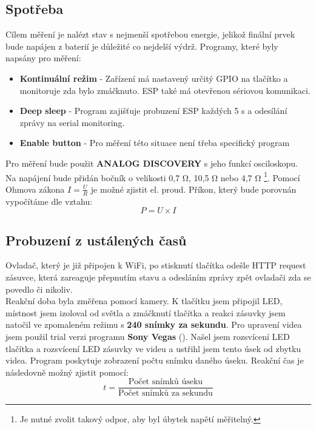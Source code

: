 \documentclass[a4paper, 12pt]{report}
\begin{document}
    \subsection{Spotřeba}
    \label{subsec:ustalene-stavy-spotreba}
    Cílem měření je nalézt stav s nejmenší spotřebou energie, jelikož finální prvek bude napájen z baterií je důležité co nejdelší výdrž.
    Programy, které byly napsány pro měření:\\
    \begin{itemize}
        \item \textbf{Kontinuální režim} - Zařízení má nastavený určitý GPIO na tlačítko a monitoruje zda bylo zmáčknuto.
        ESP také má otevřenou sériovou komunikaci.
        \item \textbf{Deep sleep} - Program zajišťuje probuzení ESP každých 5 \si{s} a odesílání zprávy na serial monitoring.
        \item \textbf{Enable button} - Pro měření této situace není třeba specifický program
    \end{itemize}
    Pro měření bude použit \textbf{ANALOG DISCOVERY} s jeho funkcí osciloskopu.
    Na napájení bude přidán bočník o velikosti 0,7 \si{\ohm}, 10,5 \si{\ohm} nebo 4,7 \si{\ohm} \footnote{Je nutné zvolit takový odpor, aby byl úbytek napětí měřitelný.}.
    Pomocí Ohmova zákona $ I = \frac{U}{R} $ je možné zjistit el. proud.
    Příkon, který bude porovnán vypočítáme dle vztahu:
    \[P = U \times I\]

    \subsection{Probuzení z ustálených časů}
    \label{subsec:ustalene-stavy-reakce}
    Ovladač, který je již připojen k WiFi, po stisknutí tlačítka odešle HTTP request zásuvce, která zareaguje přepnutím stavu a odesláním zprávy zpět ovladači zda se povedlo či nikoliv.\\
    Reakční doba byla změřena pomocí kamery.
    K tlačítku jsem připojil LED, místnost jsem izoloval od světla a zmáčknutí tlačítka a reakci zásuvky jsem natočil ve zpomaleném režimu s \textbf{240 snímky za sekundu}.
    Pro upravení videa jsem použil trial verzi programu \textbf{Sony Vegas} ().
    Našel jsem rozsvícení LED tlačítka a rozsvícení LED zásuvky ve videu a ustřihl jsem tento úsek od zbytku videa.
    Program poskytuje zobrazení počtu snímku daného úseku.
    Reakční čas je následovně možný zjistit pomocí:
    \[ t = \frac{\textrm{Počet snímků úseku}}{\textrm{Počet snímků za sekundu}}\]
\end{document}
